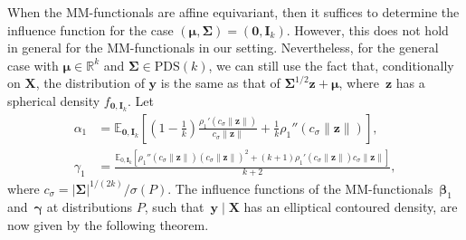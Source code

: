 \documentclass{article}
\numberwithin{equation}{section}
\theoremstyle{plain}
\newcommand{\R}{\mathbb{R}}
\newcommand{\bbeta}{\bm\beta}
\newcommand{\bgamma}{\bm\gamma}
\newcommand{\bmu}{\bm\mu}
\newcommand{\bSigma}{\mathbf{\Sigma}}
\newcommand{\by}{\mathbf{y}}
\newcommand{\bz}{\mathbf{z}}
\newcommand{\bX}{\mathbf{X}}
\newcommand{\bI}{\mathbf{I}}
\begin{document}
When the MM-functionals are affine equivariant,
then it suffices to determine the influence function for the case $(\bmu,\bSigma)=(\mathbf{0},\bI_k)$.
However, this does not hold in general for the MM-functionals in our setting.
Nevertheless, for the general case with $\bmu\in\R^k$ and $\bSigma\in\text{PDS}(k)$,
we can still use the fact that, conditionally on $\bX$, the distribution of $\by$ is the same as that of
$\bSigma^{1/2}\bz+\bmu$, where~$\bz$ has a spherical density $f_{\mathbf{0},\bI_k}$.
Let 
\begin{equation}
\label{def:alpha1-gamma1}
\begin{split}
\alpha_1
&=
\mathbb{E}_{\mathbf{0},\bI_k}
\left[
\left(
1-\frac{1}{k}
\right)
\frac{\rho_1'\left(c_\sigma\|\bz\|\right)}{c_\sigma\|\bz\|}
+
\frac1k
\rho_1''\left(c_\sigma\|\bz\|\right)
\right],\\
\gamma_1
&=
\frac{\mathbb{E}_{0,\mathbf{I}_k}
\left[
\rho_1''(c_\sigma\|\bz\|)(c_\sigma\|\bz\|)^2+(k+1)\rho_1'(c_\sigma\|\bz\|)c_\sigma\|\bz\|
\right]}{k+2},
\end{split}
\end{equation}
where $c_\sigma=|\bSigma|^{1/(2k)}/\sigma(P)$.
The influence functions of the MM-functionals~$\bbeta_1$ 
and~$\bgamma$ at distributions $P$, such that~$\by\mid\bX$ has an elliptical contoured density, 
are now given by the following theorem.
\end{document}
